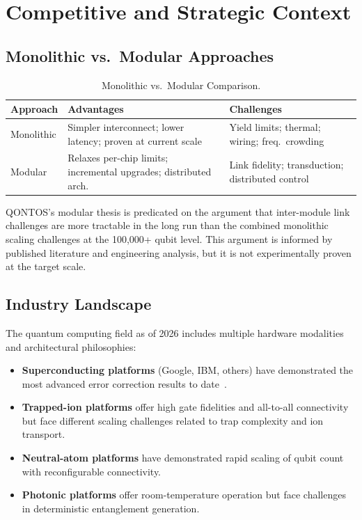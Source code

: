 \documentclass[conference]{IEEEtran}
\begin{document}
\section{Competitive and Strategic Context}

\subsection{Monolithic vs.\ Modular Approaches}

\begin{table}[htbp]
\centering
\caption{Monolithic vs.\ Modular Comparison.}
\label{tab:mono_mod}
\begin{tabular}{lp{3.5cm}p{3.5cm}}
\toprule
\textbf{Approach} & \textbf{Advantages} & \textbf{Challenges} \\
\midrule
Monolithic & Simpler interconnect; lower latency; proven at current scale & Yield limits; thermal; wiring; freq.\ crowding \\
Modular & Relaxes per-chip limits; incremental upgrades; distributed arch. & Link fidelity; transduction; distributed control \\
\bottomrule
\end{tabular}
\end{table}

QONTOS's modular thesis is predicated on the argument that inter-module link challenges are more tractable in the long run than the combined monolithic scaling challenges at the 100,000+ qubit level. This argument is informed by published literature and engineering analysis, but it is not experimentally proven at the target scale.

\subsection{Industry Landscape}

The quantum computing field as of 2026 includes multiple hardware modalities and architectural philosophies:

\begin{itemize}
\item \textbf{Superconducting platforms} (Google, IBM, others) have demonstrated the most advanced error correction results to date~\cite{acharya2024, googleqai2023, krinner2022}.
\item \textbf{Trapped-ion platforms} offer high gate fidelities and all-to-all connectivity but face different scaling challenges related to trap complexity and ion transport.
\item \textbf{Neutral-atom platforms} have demonstrated rapid scaling of qubit count with reconfigurable connectivity.
\item \textbf{Photonic platforms} offer room-temperature operation but face challenges in deterministic entanglement generation.
\end{itemize}
\end{document}
